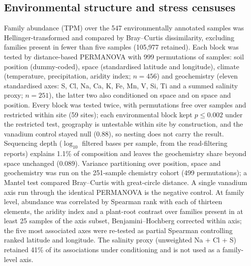 \documentclass[11pt]{article}
\begin{document}
\subsection*{Environmental structure and stress censuses}
Family abundance (TPM) over the 547 environmentally annotated samples was Hellinger-transformed and
compared by Bray--Curtis dissimilarity, excluding families present in fewer than five samples
(105{,}977 retained). Each block was tested by distance-based PERMANOVA \citep{mcardle2001dbrda}
with 999 permutations of samples: soil position (dummy-coded), space (standardised latitude and
longitude), climate (temperature, precipitation, aridity index; $n = 456$) and geochemistry (eleven
standardised axes: S, Cl, Na, Ca, K, Fe, Mn, V, Si, Ti and a summed salinity proxy; $n = 251$), the
latter two also conditioned on space and on space and position. Every block was tested twice, with
permutations free over samples and restricted within site (59 sites); each environmental block kept
$p \leq 0.002$ under the restricted test, geography is untestable within site by construction, and
the vanadium control stayed null (0.88), so nesting does not carry the result. Sequencing depth ($\log_{10}$ filtered bases per sample, from the read-filtering
reports) explains 1.1\% of composition and leaves the geochemistry share beyond space unchanged
(0.089). Variance partitioning \citep{borcard1992varpart} over position, space and
geochemistry was run on the 251-sample chemistry cohort (499 permutations); a Mantel test
\citep{mantel1967} compared Bray--Curtis with great-circle distance. A single vanadium axis run
through the identical PERMANOVA is the negative control. At family level, abundance was correlated
by Spearman rank with each of thirteen elements, the aridity index and a plant-root contrast over
families present in at least 25 samples of the axis subset, Benjamini--Hochberg corrected within
axis; the five most associated axes were re-tested as partial Spearman controlling ranked latitude
and longitude. The salinity proxy (unweighted Na + Cl + S) retained 41\% of its associations under
conditioning and is not used as a family-level axis.
\end{document}
